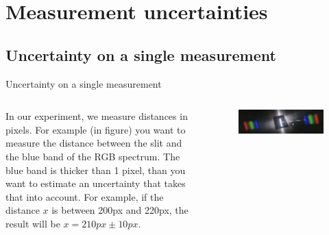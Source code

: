 \documentclass[9pt, xcolor=dvipsnames]{beamer}
\begin{document}


\section{Measurement uncertainties}





\subsection{Uncertainty on a single measurement}

\begin{frame}{Uncertainty on a single measurement }
%	
%	
\begin{columns}
	

	In our experiment, we measure distances in pixels. For example (in figure) you want to measure the distance between the slit and the blue band of the RGB spectrum. The blue band is thicker than 1 pixel, than you want to estimate an uncertainty that takes that into account. For example, if the distance $x$  is between 200px and 220px, the result will be $x = 210px \pm 10px$.
	
		
	\begin{figure}
		\begin{centering}
			\centering
			\includegraphics[width=1 \textwidth]{Figures/laptop.png}
		\end{centering}
		\end{figure}
\end{columns}
		
		
\end{frame}
\end{document}
